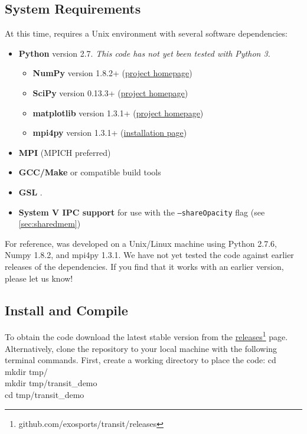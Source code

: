 \documentclass[letterpaper, 12pt]{article}
\begin{document}
\subsection{System Requirements}

At this time, {\transit} requires a Unix environment with several software
dependencies:

\begin{itemize} \itemsep0pt
\item \textbf{Python} version 2.7. \emph{This code has not yet been tested with
      Python 3.}
\begin{itemize} \itemsep0pt
  \item \textbf{NumPy} version 1.8.2+
        (\href{http://www.numpy.org/}{project homepage})
  \item \textbf{SciPy} version 0.13.3+
        (\href{http://www.scipy.org/}{project homepage})
  \item \textbf{matplotlib} version 1.3.1+
        (\href{http://matplotlib.org/}{project homepage})
  \item \textbf{mpi4py} version 1.3.1+
        (\href{http://mpi4py.scipy.org/docs/usrman/install.html}{installation page})
\end{itemize}
\item \textbf{MPI} (MPICH preferred)
\item \textbf{GCC/Make} or compatible build tools
\item \textbf{GSL} .
\item \textbf{System V IPC support} for use with the {\tt --shareOpacity}
      flag (see {\ref{sec:sharedmem}})
\end{itemize}

For reference, {\transit} was developed on a Unix/Linux machine using Python
2.7.6, Numpy 1.8.2, and mpi4py 1.3.1. We have not yet tested the code against
earlier releases of the dependencies. If you find that it works with an earlier
version, please let us know!

\subsection{Install and Compile}
\label{sec:compile}

To obtain the {\transit} code download the latest stable version from
the \href{https://github.com/exosports/transit/releases}
{releases}\footnote{github.com/exosports/transit/releases} page.
Alternatively, clone the repository to your local machine with the
following terminal commands.  First, create a working directory to
place the code: \newline
{\tttb cd} \\
{\tttb mkdir tmp/} \\
{\tttb mkdir tmp/transit\_demo} \\
{\tttb cd tmp/transit\_demo} \\
\end{document}
